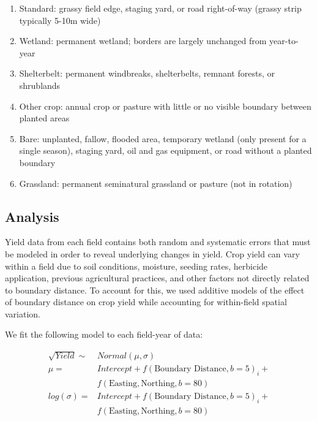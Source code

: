 \documentclass[]{elsarticle} %
\providecommand{\tightlist}{%
  \setlength{\itemsep}{0pt}\setlength{\parskip}{0pt}}
\begin{document}
\begin{enumerate}
\def\labelenumi{\arabic{enumi}.}
\tightlist
\item
  Standard: grassy field edge, staging yard, or road right-of-way (grassy strip typically 5-10m wide)
\item
  Wetland: permanent wetland; borders are largely unchanged from year-to-year
\item
  Shelterbelt: permanent windbreaks, shelterbelts, remnant forests, or shrublands
\item
  Other crop: annual crop or pasture with little or no visible boundary between planted areas
\item
  Bare: unplanted, fallow, flooded area, temporary wetland (only present for a single season), staging yard, oil and gas equipment, or road without a planted boundary
\item
  Grassland: permanent seminatural grassland or pasture (not in rotation)
\end{enumerate}

\hypertarget{analysis}{%
\subsection{Analysis}\label{analysis}}

Yield data from each field contains both random and systematic errors that must be modeled in order to reveal underlying changes in yield.
Crop yield can vary within a field due to soil conditions, moisture, seeding rates, herbicide application, previous agricultural practices, and other factors not directly related to boundary distance.
To account for this, we used additive models of the effect of boundary distance on crop yield while accounting for within-field spatial variation.

We fit the following model to each field-year of data:

\begin{equation}
  \begin{split}
  \sqrt{Yield} \sim & Normal (\mu, \sigma)\\
  \mu = & Intercept + f(\text{Boundary Distance}, b=5)_i + \\
   & f(\text{Easting}, \text{Northing}, b=80)\\
  log(\sigma) =  & Intercept + f(\text{Boundary Distance}, b=5)_i + \\
   & f(\text{Easting}, \text{Northing}, b=80)\\
  \end{split}
  \end{equation}
\end{document}
